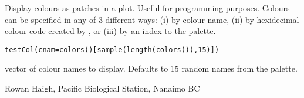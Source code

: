 \documentclass[letterpaper]{book}
\begin{document}
\begin{Description}\relax
Display colours as patches in a plot. Useful for programming purposes. 
Colours can be specified in any of 3 different ways: (i) by colour name, 
(ii) by hexidecimal colour code created by , or (iii) by an 
index to the  palette.
\end{Description}
\begin{Usage}
\begin{verbatim}
testCol(cnam=colors()[sample(length(colors()),15)])
\end{verbatim}
\end{Usage}
\begin{Arguments}
\begin{ldescription}
\item[\code{cnam}] vector of colour names to display. Defaults to 15 random names 
from the  palette.
\end{ldescription}
\end{Arguments}
\begin{Author}\relax
Rowan Haigh, Pacific Biological Station, Nanaimo BC
\end{Author}
\begin{SeeAlso}\relax
{}
\end{SeeAlso}
\begin{Examples}
\end{Examples}
\end{document}
